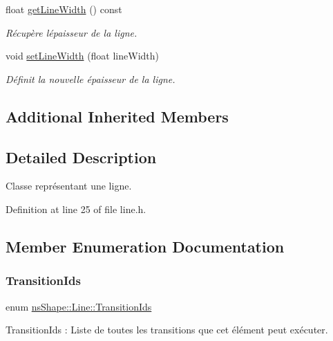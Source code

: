 \begin{DoxyCompactItemize}
float \hyperlink{classns_shape_1_1_line_aab6e3cacd0062c1d5e2e55e9099a617a}{get\+Line\+Width} () const
\begin{DoxyCompactList}\small\item\em Récupère l\textquotesingle{}épaisseur de la ligne. \end{DoxyCompactList}\item 
void \hyperlink{classns_shape_1_1_line_ab98591827289680e28b4b0904e6d95f2}{set\+Line\+Width} (float line\+Width)
\begin{DoxyCompactList}\small\item\em Définit la nouvelle épaisseur de la ligne. \end{DoxyCompactList}\end{DoxyCompactItemize}
\subsection*{Additional Inherited Members}


\subsection{Detailed Description}
Classe représentant une ligne. 

Definition at line 25 of file line.\+h.



\subsection{Member Enumeration Documentation}
\mbox{\label{classns_shape_1_1_line_a446a1bbc370b3426afe05f22b681ea58}} 
\subsubsection{\texorpdfstring{Transition\+Ids}{TransitionIds}}
{\footnotesize\ttfamily enum \hyperlink{classns_shape_1_1_line_a446a1bbc370b3426afe05f22b681ea58}{ns\+Shape\+::\+Line\+::\+Transition\+Ids}}



Transition\+Ids \+: Liste de toutes les transitions que cet élément peut exécuter. 

